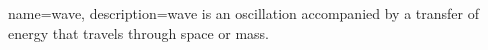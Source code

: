 {
    name=wave,
    description={wave is an oscillation accompanied by a transfer of energy that travels through space or mass.}
}
